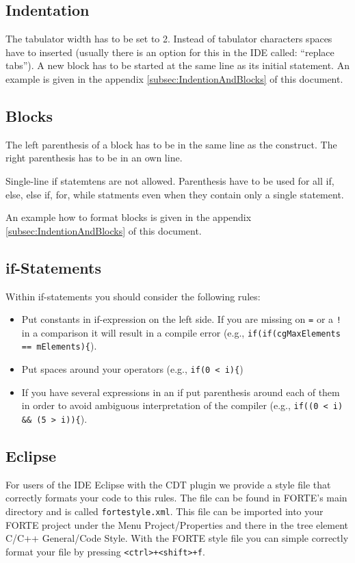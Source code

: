 \documentclass[final,a4paper,10pt, oneside]{article}
\begin{document}
\subsection{Indentation}
The tabulator width has to be set to 2. Instead of tabulator characters spaces have to inserted (usually there is an option for this in the IDE called: ``replace tabs'').
A new block has to be started at the same line as its initial statement.
An example is given in the appendix \ref{subsec:IndentionAndBlocks} of this document.

\subsection{Blocks}
The left parenthesis of a block has to be in the same line as the construct. 
The right parenthesis has to be in an own line. 

Single-line if statemtens are not allowed. 
Parenthesis have to be used for all if, else, else if, for, while statments even when they contain only a single statement.

An example how to format blocks is given in the appendix \ref{subsec:IndentionAndBlocks} of this document.

\subsection{if-Statements}
Within if-statements you should consider the following rules:
\begin{itemize}
\item Put constants in if-expression on the left side. If you are missing on \verb|=| or a \verb|!| in a 
      comparison it will result in a compile error (e.g., \verb|if(if(cgMaxElements == mElements){|).
\item Put spaces around your operators (e.g., \verb|if(0 < i){|)
\item If you have several expressions in an if put parenthesis around each of them in order to avoid 
      ambiguous interpretation of the compiler (e.g., \verb|if((0 < i) && (5 > i)){|).

\end{itemize}


\subsection{Eclipse}
For users of the IDE Eclipse with the CDT plugin we provide a style file that correctly formats your code to this rules. The file can be found in FORTE's main directory and is called \verb=fortestyle.xml=. This file can be imported into your FORTE project under the Menu Project/Properties and there in the tree element C/C++ General/Code Style. With the FORTE style file you can simple correctly format your file by pressing \verb=<ctrl>+<shift>+f=.
\end{document}
